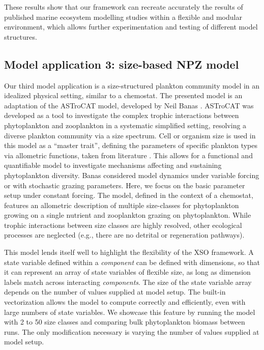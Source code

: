 \documentclass[journal abbreviation, manuscript]{copernicus}
\begin{document}
These results show that our framework can recreate accurately the results of published marine ecosystem modelling studies within a flexible and modular environment, which allows further experimentation and testing of different model structures.




\subsection{Model application 3: size-based NPZ model}

Our third model application is a size-structured plankton community model in an idealized physical setting, similar to a chemostat. The presented model is an adaptation of the ASTroCAT model, developed by Neil Banas \citep{Banas2011b}. ASTroCAT was developed as a tool to investigate the complex trophic interactions between phytoplankton and zooplankton in a systematic simplified setting, resolving a diverse plankton community via a size spectrum. Cell or organism size is used in this model as a “master trait”, defining the parameters of specific plankton types via allometric functions, taken from literature \citep{Litchman2008}. This allows for a functional and quantifiable model to investigate mechanisms affecting and sustaining phytoplankton diversity.
Banas considered model dynamics under variable forcing or with stochastic grazing parameters. Here, we focus on the basic parameter setup under constant forcing. The model, defined in the context of a chemostat, features an allometric description of multiple size-classes for phytoplankton growing on a single nutrient and zooplankton grazing on phytoplankton. While trophic interactions between size classes are highly resolved, other ecological processes are neglected (e.g., there are no detrital or regeneration pathways).  

This model lends itself well to highlight the flexibility of the XSO framework. A state variable defined within a \textit{component} can be defined with dimensions, so that it can represent an array of state variables of flexible size, as long as dimension labels match across interacting \textit{components}. The size of the state variable array depends on the number of values supplied at model setup. The built-in vectorization allows the model to compute correctly and efficiently, even with large numbers of state variables. We showcase this feature by running the model with 2 to 50 size classes and comparing bulk phytoplankton biomass between runs. The only modification necessary is varying the number of values supplied at model setup.
\end{document}
